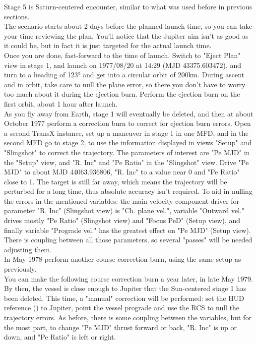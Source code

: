 \documentclass[Orbiter User Manual.tex]{subfiles}
\begin{document}
Stage 5 is Saturn-centered encounter, similar to what was used before in previous sections.\\
The scenario starts about 2 days before the planned launch time, so you can take your time reviewing the plan. You'll notice that the Jupiter aim isn't as good as it could be, but in fact it is just targeted for the actual launch time.\\
Once you are done, fast-forward to the time of launch. Switch to "Eject Plan" view in stage 1, and launch on 1977/08/20 at 14:29 (MJD 43375.603472), and turn to a heading of 123° and get into a circular orbit of 200km. During ascent and in orbit, take care to null the plane error, so there you don't have to worry too much about it during the ejection burn. Perform the ejection burn on the first orbit, about 1 hour after launch.\\
As you fly away from Earth, stage 1 will eventually be deleted, and then at about October 1977 perform a correction burn to correct for ejection burn errors. Open a second TransX instance, set up a maneuver in stage 1 in one MFD, and in the second MFD go to stage 2, to use the information displayed in views "Setup" and "Slingshot" to correct the trajectory. The parameters of interest are "Pe MJD" in the "Setup" view, and "R. Inc" and "Pe Ratio" in the "Slingshot" view. Drive "Pe MJD" to about MJD 44063.936806, "R. Inc" to a value near 0 and "Pe Ratio" close to 1. The target is still far away, which means the trajectory will be perturbed for a long time, thus absolute accuracy isn't required. To aid in nulling the errors in the mentioned variables: the main velocity component driver for parameter "R. Inc" (Slingshot view) is "Ch. plane vel.", variable "Outward vel." drives mostly "Pe Ratio" (Slingshot view) and "Focus PeD" (Setup view), and finally variable "Prograde vel." has the greatest effect on "Pe MJD" (Setup view). There is coupling between all those parameters, so several "passes" will be needed adjusting them.\\
In May 1978 perform another course correction burn, using the same setup as previously.\\
You can make the following course correction burn a year later, in late May 1979. By then, the vessel is close enough to Jupiter that the Sun-centered stage 1 has been deleted. This time, a "manual" correction will be performed: set the HUD reference (\Ctrl{}) to Jupiter, point the vessel prograde and use the RCS to null the trajectory errors.
As before, there is some coupling between the variables, but for the most part, to change "Pe MJD" thrust forward or back, "R. Inc" is up or down, and "Pe Ratio" is left or right.\\
\end{document}
